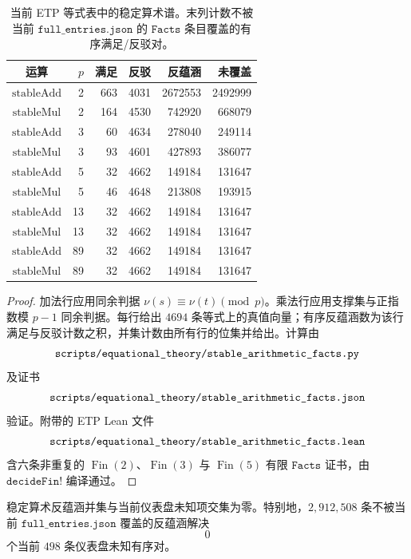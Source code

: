 \documentclass[../../main.tex]{subfiles}
\begin{document}
\begin{table}[H]
\centering
\scriptsize
\setlength{\tabcolsep}{5pt}
\caption{当前 ETP 等式表中的稳定算术谱。末列计数不被当前 \(\texttt{full\_entries.json}\) 的 \(\texttt{Facts}\) 条目覆盖的有序满足/反驳对。}
\label{tab:stable-audit-stable-spectra}
\begin{tabular}{c r r r r r}
\toprule
运算 & \(p\) & 满足 & 反驳 & 反蕴涵 & 未覆盖\\
\midrule
\(\mathrm{stableAdd}\) & 2  & 663 & 4031 & 2672553 & 2492999\\
\(\mathrm{stableMul}\) & 2  & 164 & 4530 & 742920  & 668079\\
\(\mathrm{stableAdd}\) & 3  & 60  & 4634 & 278040  & 249114\\
\(\mathrm{stableMul}\) & 3  & 93  & 4601 & 427893  & 386077\\
\(\mathrm{stableAdd}\) & 5  & 32  & 4662 & 149184  & 131647\\
\(\mathrm{stableMul}\) & 5  & 46  & 4648 & 213808  & 193915\\
\(\mathrm{stableAdd}\) & 13 & 32  & 4662 & 149184  & 131647\\
\(\mathrm{stableMul}\) & 13 & 32  & 4662 & 149184  & 131647\\
\(\mathrm{stableAdd}\) & 89 & 32  & 4662 & 149184  & 131647\\
\(\mathrm{stableMul}\) & 89 & 32  & 4662 & 149184  & 131647\\
\bottomrule
\end{tabular}
\end{table}

\begin{proof}
加法行应用同余判据 \(\nu(s)\equiv\nu(t)\pmod p\)。乘法行应用支撑集与正指数模 \(p-1\) 同余判据。每行给出 \(4694\) 条等式上的真值向量；有序反蕴涵数为该行满足与反驳计数之积，并集计数由所有行的位集并给出。计算由
\[
    \texttt{\detokenize{scripts/equational_theory/stable_arithmetic_facts.py}}
\]
及证书
\[
    \texttt{\detokenize{scripts/equational_theory/stable_arithmetic_facts.json}}
\]
验证。附带的 ETP Lean 文件
\[
    \texttt{\detokenize{scripts/equational_theory/stable_arithmetic_facts.lean}}
\]
含六条非重复的 \(\operatorname{Fin}(2)\)、\(\operatorname{Fin}(3)\) 与 \(\operatorname{Fin}(5)\) 有限 \(\texttt{Facts}\) 证书，由 \(\texttt{decideFin!}\) 编译通过。
\end{proof}

\begin{corollary}[稳定谱的仪表盘不相交性]\label{cor:stable-audit-stable-dashboard-disjoint}
稳定算术反蕴涵并集与当前仪表盘未知项交集为零。特别地，\(2{,}912{,}508\) 条不被当前 \(\texttt{full\_entries.json}\) 覆盖的反蕴涵解决
\[
    0
\]
个当前 \(498\) 条仪表盘未知有序对。
\end{corollary}
\end{document}
